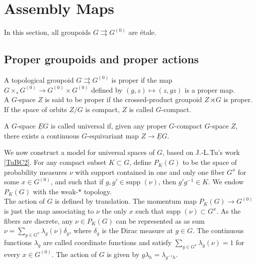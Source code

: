 \section{Assembly Maps}

In this section, all groupoids $G\rightrightarrows G^{(0)}$ are étale. 

\subsection{Proper groupoids and proper actions}

\begin{definition}
A topological groupoid $G\rightrightarrows G^{(0)}$ is proper if the map $G\times_s G^{(0)}\rightarrow G^{(0)}\times G^{(0)}$ defined by $(g,z)\mapsto (z,gz)$ is a proper map.\\
A $G$-space $Z$ is said to be proper if the crossed-product groupoid $Z\rtimes G$ is proper. If the space of orbits $Z/G$ is compact, $Z$ is called $G$-compact.\\
\end{definition}

\begin{definition}
A $G$-space $\underline E G$ is called universal if, given any proper $G$-compact $G$-space $Z$, there exists a continuous $G$-equivariant map $Z\rightarrow \underline E G$.
\end{definition}

We now construct a model for universal spaces of $G$, based on J.-L.Tu's work \ref{TuBC2}. For any compact subset $K\subset G$, define $P_K(G)$ to be the space of probability measures $\nu $ with support contained in one and only one fiber $G^x$ for some $x\in G^{(0)}$, and such that if $g,g'\in \text{supp }(\nu)$, then $g'g^{-1}\in K$. We endow $P_K(G)$ with the weak-$*$ topology.\\

The action of $G$ is defined by translation. The momentum map $P_K(G)\rightarrow G^{(0)}$ is just the map associating to $\nu$ the only $x$ such that $\text{supp }(\nu) \subset G^x$. As the fibers are discrete, any $\nu\in P_K(G)$ can be represented as as sum $\nu = \sum_{g\in G^x} \lambda_g(\nu)\delta_g$, where $\delta_g$ is the Dirac measure at $g\in G $. The continuous functions $\lambda_g$ are called coordinate functions and satisfy $\sum_{g\in G^x} \lambda_g(\nu) =1$ for every $x\in G^{(0)}$. The action of $G$ is given by $g\lambda_h = \lambda_{g^{-1}h}$.\\

